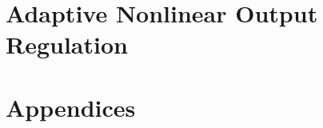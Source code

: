 \documentclass[
	twoside,openright,titlepage,numbers=noenddot,headinclude,
	footinclude=true,cleardoublepage=empty,
	dottedtoc, %
	BCOR=5mm,paper=a4,fontsize=11pt, %
	american, %
]{scrreprt}
\begin{document}
\part{Adaptive Nonlinear Output Regulation}


\cleardoublepage %


\cleardoublepage %

% 

\appendix
\part{Appendices} %



\cleardoublepage

\end{document}
